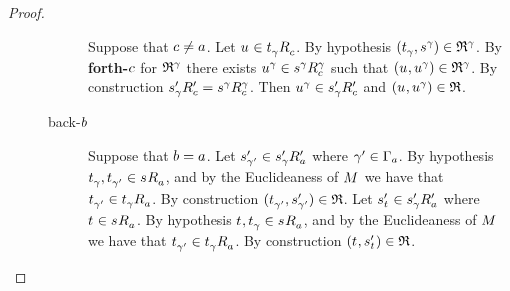 \begin{proof}
\begin{description}
\begin{description}
                Suppose that $\agentC \neq \agentA$.
                Let $\kStateU \in \kSuccessorsC{\kStateT_\gamma}$.
                By hypothesis $(\kStateT_\gamma, \kStateS[\gamma]) \in \refinement^\gamma$.
                By {\bf forth-$\agentC$} for $\refinement^\gamma$ there exists $\kStateU[\gamma] \in \kSuccessorsC[\gamma]{\kStateS[\gamma]}$ such that $(\kStateU, \kStateU[\gamma]) \in \refinement^\gamma$.
                By construction $\kSuccessorsPC{\kStateSP_\gamma} = \kSuccessorsC[\gamma]{\kStateS[\gamma]}$.
                Then $\kStateU[\gamma] \in \kSuccessorsPC{\kStateSP_\gamma}$ and $(\kStateU, \kStateU[\gamma]) \in \refinement$.
            \item[back-$\agentB$]
                Suppose that $\agentB = \agentA$.
                Let $\kStateSP_{\gamma'} \in \kSuccessorsPA{\kStateSP_\gamma}$ where $\gamma' \in \Gamma_\agentA$.
                By hypothesis $\kStateT_{\gamma}, \kStateT_{\gamma'} \in \kSuccessorsA{\kStateS}$, and by the Euclideaness of $\kModel$ we have that $\kStateT_{\gamma'} \in \kSuccessorsA{\kStateT_\gamma}$.
                By construction $(\kStateT_{\gamma'}, \kStateSP_{\gamma'}) \in \refinement$.
                Let $\kStateSP_{\kStateT} \in \kSuccessorsPA{\kStateSP_\gamma}$ where $\kStateT \in \kSuccessorsA{\kStateS}$.
                By hypothesis $\kStateT, \kStateT_{\gamma} \in \kSuccessorsA{\kStateS}$, and by the Euclideaness of $\kModel$ we have that $\kStateT_{\gamma'} \in \kSuccessorsA{\kStateT_\gamma}$.
                By construction $(\kStateT, \kStateSP_{\kStateT}) \in \refinement$.


\end{description}
\end{description}
\end{proof}
